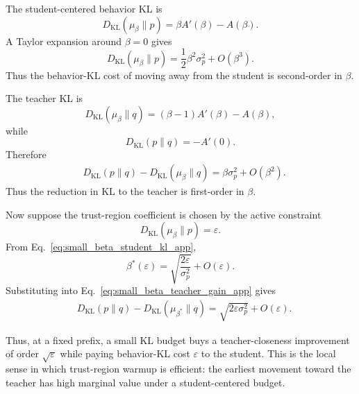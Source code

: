 \documentclass{llmxive}
\begin{document}
The student-centered behavior KL is
\begin{equation}
D_{\mathrm{KL}}(\mu_\beta\|p)
=
\beta A'(\beta)-A(\beta).
\end{equation}
A Taylor expansion around $\beta=0$ gives
\begin{equation}
D_{\mathrm{KL}}(\mu_\beta\|p)
=
\frac{1}{2}\beta^2\sigma_p^2
+
O(\beta^3).
\label{eq:small_beta_student_kl_app}
\end{equation}
Thus the behavior-KL cost of moving away from the student is second-order in $\beta$.

The teacher KL is
\begin{equation}
D_{\mathrm{KL}}(\mu_\beta\|q)
=
(\beta-1)A'(\beta)-A(\beta),
\end{equation}
while
\begin{equation}
D_{\mathrm{KL}}(p\|q)
=
-A'(0).
\end{equation}
Therefore
\begin{equation}
\begin{aligned}
&D_{\mathrm{KL}}(p\|q)
-
D_{\mathrm{KL}}(\mu_\beta\|q)
 =
\beta\sigma_p^2
+
O(\beta^2).
\end{aligned}
\label{eq:small_beta_teacher_gain_app}
\end{equation}
Thus the reduction in KL to the teacher is first-order in $\beta$.

Now suppose the trust-region coefficient is chosen by the active constraint
\[
D_{\mathrm{KL}}(\mu_\beta\|p)=\varepsilon.
\]
From Eq.~\ref{eq:small_beta_student_kl_app},
\begin{equation}
\beta^*(\varepsilon)
=
\sqrt{\frac{2\varepsilon}{\sigma_p^2}}
+
O(\varepsilon).
\label{eq:small_eps_beta_star_app}
\end{equation}
Substituting into Eq.~\ref{eq:small_beta_teacher_gain_app} gives
\begin{equation}
\begin{aligned}
&D_{\mathrm{KL}}(p\|q)
-
D_{\mathrm{KL}}(\mu_{\beta^*}\|q)
 =
\sqrt{2\varepsilon\sigma_p^2}
+
O(\varepsilon).
\end{aligned}
\label{eq:small_eps_teacher_gain_app}
\end{equation}

Thus, at a fixed prefix, a small KL budget buys a teacher-closeness improvement of order $\sqrt{\varepsilon}$ while paying behavior-KL cost $\varepsilon$ to the student.
This is the local sense in which trust-region warmup is efficient: the earliest movement toward the teacher has high marginal value under a student-centered budget.
\end{document}
